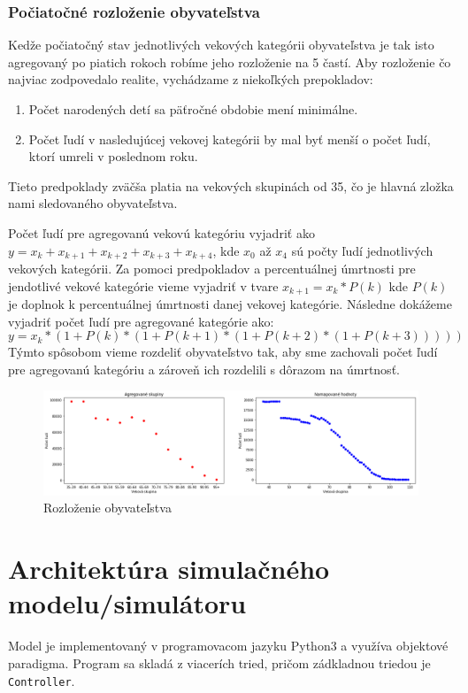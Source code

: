 \documentclass[a4paper, 11pt]{article}
\begin{document}
\subsubsection*{Počiatočné rozloženie obyvateľstva}
Kedže počiatočný stav jednotlivých vekových kategórii obyvateľstva je tak isto agregovaný po piatich rokoch robíme jeho rozloženie na 5 častí. Aby rozloženie čo najviac zodpovedalo realite, vychádzame z niekoľkých prepokladov:
\begin{enumerate}
\item Počet narodených detí sa päťročné obdobie mení minimálne.
\item Počet ľudí v nasledujúcej vekovej kategórii by mal byť menší o počet ľudí, ktorí umreli v poslednom roku.
\end{enumerate}
Tieto predpoklady zväčša platia na vekových skupinách od 35, čo je hlavná zložka nami sledovaného obyvateľstva.

Počet ľudí pre agregovanú vekovú kategóriu vyjadriť ako $y = x_{k} + x_{k+1} + x_{k+2} + x_{k+3} + x_{k+4}$, kde $x_0$ až $x_4$ sú počty ľudí jednotlivých vekových kategórii. Za pomoci predpokladov a percentuálnej úmrtnosti pre jendotlivé vekové kategórie vieme vyjadriť v tvare $x_{k+1}=x_{k}*P(k)$ kde $P(k)$ je doplnok k percentuálnej úmrtnosti danej vekovej kategórie. Následne dokážeme vyjadriť počet ľudí pre agregované kategórie ako:
$$y = x_k*(1 + P(k)*(1 + P(k+1)*(1 + P(k+2) * (1 + P(k+3)))))$$
Týmto spôsobom vieme rozdeliť obyvateľstvo tak, aby sme zachovali počet ľudí pre agregovanú kategóriu a zároveň ich rozdelili s dôrazom na úmrtnosť.
\begin{figure}[H]
\centering
\includegraphics[width=1\textwidth]{exp_3}
\caption{Rozloženie obyvateľstva}
\end{figure}

\section{Architektúra simulačného modelu/simulátoru}
Model je implementovaný v programovacom jazyku Python3 a využíva objektové paradigma. Program sa skladá z viacerích tried, pričom zádkladnou triedou je \texttt{Controller}.
\end{document}
